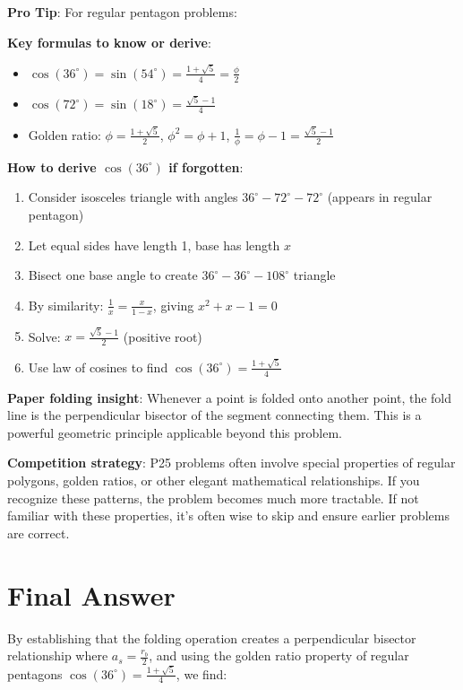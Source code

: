 \documentclass[12pt]{article}
\begin{document}
\begin{tipbox}
\textbf{Pro Tip}: For regular pentagon problems:

\textbf{Key formulas to know or derive}:
\begin{itemize}
    \item $\cos(36^\circ) = \sin(54^\circ) = \frac{1+\sqrt{5}}{4} = \frac{\phi}{2}$
    \item $\cos(72^\circ) = \sin(18^\circ) = \frac{\sqrt{5}-1}{4}$
    \item Golden ratio: $\phi = \frac{1+\sqrt{5}}{2}$, $\phi^2 = \phi+1$, $\frac{1}{\phi} = \phi-1 = \frac{\sqrt{5}-1}{2}$
\end{itemize}

\textbf{How to derive $\cos(36^\circ)$ if forgotten}:
\begin{enumerate}
    \item Consider isosceles triangle with angles $36^\circ-72^\circ-72^\circ$ (appears in regular pentagon)
    \item Let equal sides have length 1, base has length $x$
    \item Bisect one base angle to create $36^\circ-36^\circ-108^\circ$ triangle
    \item By similarity: $\frac{1}{x} = \frac{x}{1-x}$, giving $x^2+x-1=0$
    \item Solve: $x = \frac{\sqrt{5}-1}{2}$ (positive root)
    \item Use law of cosines to find $\cos(36^\circ) = \frac{1+\sqrt{5}}{4}$
\end{enumerate}

\textbf{Paper folding insight}: Whenever a point is folded onto another point, the fold line is the perpendicular bisector of the segment connecting them. This is a powerful geometric principle applicable beyond this problem.

\textbf{Competition strategy}: P25 problems often involve special properties of regular polygons, golden ratios, or other elegant mathematical relationships. If you recognize these patterns, the problem becomes much more tractable. If not familiar with these properties, it's often wise to skip and ensure earlier problems are correct.
\end{tipbox}

\section*{Final Answer}

By establishing that the folding operation creates a perpendicular bisector relationship where $a_s = \frac{r_b}{2}$, and using the golden ratio property of regular pentagons $\cos(36^\circ) = \frac{1+\sqrt{5}}{4}$, we find:
\end{document}
